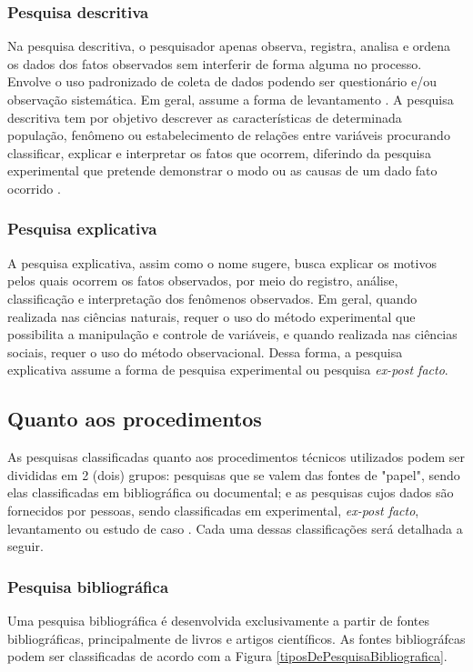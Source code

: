 \subsubsection{Pesquisa descritiva}
	Na pesquisa descritiva, o pesquisador apenas observa, registra, analisa e ordena os dados dos fatos observados sem interferir de forma alguma no processo. Envolve o uso padronizado de coleta de dados podendo ser questionário e/ou observação sistemática. Em geral, assume a forma de levantamento \cite{ac2002elaborar}. 
A pesquisa descritiva tem por objetivo descrever as características de determinada população, fenômeno ou estabelecimento de relações entre variáveis procurando classificar, explicar e interpretar os fatos que ocorrem, diferindo da pesquisa experimental que pretende demonstrar o modo ou as causas de um dado fato ocorrido \cite{prodanov2013metodologia}.
\subsubsection{Pesquisa explicativa}
	A pesquisa explicativa, assim como o nome sugere, busca explicar os motivos pelos quais ocorrem os fatos observados, por meio do registro, análise, classificação e interpretação dos fenômenos observados. 
Em geral, quando realizada nas ciências naturais, requer o uso do método experimental que possibilita a manipulação e controle de variáveis, e quando realizada nas ciências sociais, requer o uso do método observacional. Dessa forma, a pesquisa explicativa assume a forma de pesquisa experimental ou pesquisa \textit{ex-post facto}. \cite{prodanov2013metodologia}

\subsection{Quanto aos procedimentos}
	As pesquisas classificadas quanto aos procedimentos técnicos utilizados podem ser divididas em 2 (dois) grupos: pesquisas que se valem das fontes de "papel", sendo elas classificadas em bibliográfica ou documental; e as pesquisas cujos dados são fornecidos por pessoas, sendo classificadas em experimental, \textit{ex-post facto}, levantamento ou estudo de caso \cite{ac2002elaborar}. Cada uma dessas classificações será detalhada a seguir.

\subsubsection{Pesquisa bibliográfica} 
	Uma pesquisa bibliográfica é desenvolvida exclusivamente a partir de fontes bibliográficas, principalmente de livros e artigos científicos. As fontes bibliográfcas podem ser classificadas de acordo com a Figura \ref{tiposDePesquisaBibliografica}.

